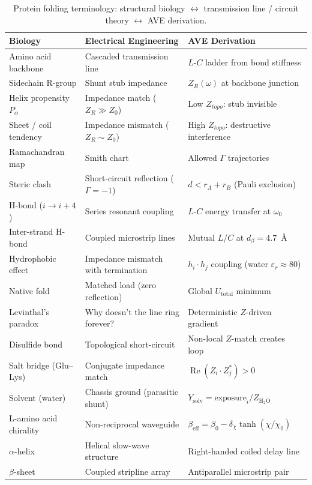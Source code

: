 %

\begin{table}[H]
\centering
\caption{Protein folding terminology: structural biology $\leftrightarrow$ transmission line / circuit theory $\leftrightarrow$ AVE derivation.}
\label{tab:trans_protein}
\small
\renewcommand{\arraystretch}{1.2}
\begin{tabular}{@{}p{4.5cm} p{4.5cm} p{4.5cm}@{}}
\toprule
\textbf{Biology} & \textbf{Electrical Engineering} & \textbf{AVE Derivation} \\
\midrule
Amino acid backbone & Cascaded transmission line & $L$-$C$ ladder from bond stiffness \\
Sidechain R-group & Shunt stub impedance & $Z_R(\omega)$ at backbone junction \\
Helix propensity $P_\alpha$ & Impedance match ($Z_R \gg Z_0$) & Low $Z_{topo}$: stub invisible \\
Sheet / coil tendency & Impedance mismatch ($Z_R \sim Z_0$) & High $Z_{topo}$: destructive interference \\
Ramachandran map & Smith chart & Allowed $\Gamma$ trajectories \\
Steric clash & Short-circuit reflection ($\Gamma = -1$\gammaundeclared{}) & $d < r_A + r_B$ (Pauli exclusion) \\
H-bond ($i \to i{+}4$) & Series resonant coupling & $L$-$C$ energy transfer at $\omega_0$ \\
Inter-strand H-bond & Coupled microstrip lines & Mutual $L$/$C$ at $d_\beta = 4.7$~\AA \\
Hydrophobic effect & Impedance mismatch with termination & $h_i \cdot h_j$ coupling (water $\varepsilon_r \approx 80$) \\
Native fold & Matched load (zero reflection) & Global $U_{\text{total}}$ minimum \\
Levinthal's paradox & Why doesn't the line ring forever? & Deterministic $Z$-driven gradient \\
Disulfide bond & Topological short-circuit & Non-local $Z$-match creates loop \\
Salt bridge (Glu--Lys) & Conjugate impedance match & $\operatorname{Re}(Z_i \cdot Z_j^*) > 0$ \\
Solvent (water) & Chassis ground (parasitic shunt) & $Y_{\text{solv}} = \text{exposure}_i / Z_{\text{H}_2\text{O}}$ \\
L-amino acid chirality & Non-reciprocal waveguide & $\beta_{\text{eff}} = \beta_0 - \delta_\chi \tanh(\chi/\chi_0)$ \\
$\alpha$-helix & Helical slow-wave structure & Right-handed coiled delay line \\
$\beta$-sheet & Coupled stripline array & Antiparallel microstrip pair \\
\bottomrule
\end{tabular}
\end{table}
